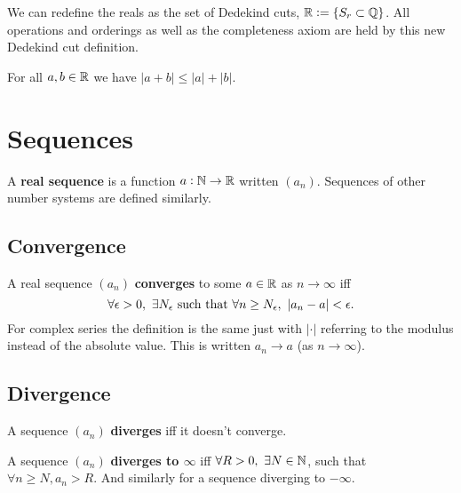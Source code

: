 \begin{theorem}
    We can redefine the reals as the set of Dedekind cuts, $\mathbb{R}:= \{S_r\subset\mathbb{Q}\}$. All operations and orderings as well as the completeness axiom are held by this new Dedekind cut definition.
\end{theorem}

\begin{theorem}
    For all $a,b\in\mathbb{R}$ we have $|a+b|\leq |a|+|b|$.
\end{theorem}

\section{Sequences}

\begin{definition}
    A \textbf{real sequence} is a function $a:\mathbb{N}\rightarrow\mathbb{R}$ written $(a_n)$. Sequences of other number systems are defined similarly.
\end{definition}

\subsection{Convergence}

\begin{definition}
    A real sequence $(a_n)$ \textbf{converges} to some $a\in\mathbb{R}$  as $n\rightarrow\infty$ iff \[
    \forall \epsilon>0, \  \exists N_\epsilon \ \text{\textcolor{black}{such that }} \forall n\geq N_\epsilon, \ |a_n-a|<\epsilon
    \textcolor{black}{.}
    \] For complex series the definition is the same just with $|\cdot|$ referring to the modulus instead of the absolute value. This is written $a_n\rightarrow a$ (as $n\rightarrow\infty$).
\end{definition}

\subsection{Divergence}

\begin{definition}[Divergence]
    A sequence $(a_n)$ \textbf{diverges} iff it doesn't converge.
\end{definition}

\begin{definition}
    A sequence $(a_n)$ \textbf{diverges to $\infty$} iff $\forall R>0, \ \exists N\in\mathbb{N}$, such that $\forall n\geq N, a_n>R$. And similarly for a sequence diverging to $-\infty$.
\end{definition}

